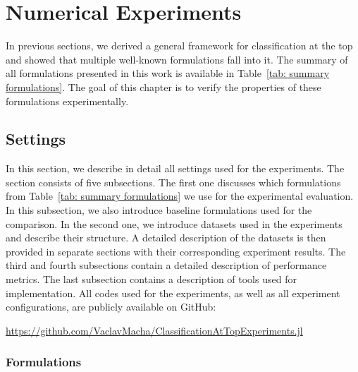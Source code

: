 \chapter{Numerical Experiments}\label{chap: experiments}

In previous sections, we derived a general framework for classification at the top and showed that multiple well-known formulations fall into it. The summary of all formulations presented in this work is available in Table~\ref{tab: summary formulations}. The goal of this chapter is to verify the properties of these formulations experimentally.

\section{Settings}\label{sec: settings}

In this section, we describe in detail all settings used for the experiments. The section consists of five subsections. The first one discusses which formulations from Table~\ref{tab: summary formulations} we use for the experimental evaluation. In this subsection, we also introduce baseline formulations used for the comparison. In the second one, we introduce datasets used in the experiments and describe their structure. A detailed description of the datasets is then provided in separate sections with their corresponding experiment results. The third and fourth subsections contain a detailed description of performance metrics. The last subsection contains a description of tools used for implementation. All codes used for the experiments, as well as all experiment configurations, are publicly available on GitHub:
\begin{center}
  \url{https://github.com/VaclavMacha/ClassificationAtTopExperiments.jl}
\end{center}

\subsection{Formulations}

